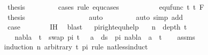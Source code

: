 \begin{isabellebody}
\ {\isacharquery}{\kern0pt}thesis\ \isanewline
\ \ \ \ \ \ \ \isamarkupfalse%
{\isacharparenleft}{\kern0pt}cases\ rule{\isacharcolon}{\kern0pt}\ equ{\isachardot}{\kern0pt}cases{\isacharparenright}{\kern0pt}\isanewline
\ \ \ \ \ \ \ \ \ \isamarkupfalse%
\ {\isacharparenleft}{\kern0pt}equ{\isacharunderscore}{\kern0pt}func\ t{}\ t{}\ F{\isacharparenright}{\kern0pt}\isanewline
\ \ \ \ \ \ \ \ \ \isamarkupfalse%
\ \isamarkupfalse%
\ {\isacharquery}{\kern0pt}thesis\ \isanewline
\ \ \ \ \ \ \ \ \ \ \ \isamarkupfalse%
\ {}\ {}{\isacharparenleft}{\kern0pt}{}{\isacharcomma}{\kern0pt}{}{\isacharcomma}{\kern0pt}{}{\isacharcomma}{\kern0pt}{}{\isacharparenright}{\kern0pt}\ \isamarkupfalse%
\ auto\isanewline
\ \ \ \ \ \ \ \isamarkupfalse%
\ {\isacharparenleft}{\kern0pt}auto\ simp\ add{\isacharcolon}{\kern0pt}\ {}{\isacharparenright}{\kern0pt}\isanewline
\ \ \ \ \ \isamarkupfalse%
\isanewline
\ \ \ \isamarkupfalse%
\isanewline
\ \ \ \isamarkupfalse%
\ \isamarkupfalse%
\ {\isacharquery}{\kern0pt}case\ \isanewline
\ \ \ \ \ \isamarkupfalse%
\ IH{\isacharparenleft}{\kern0pt}{}{\isacharcomma}{\kern0pt}{}{\isacharparenright}{\kern0pt}\ \isamarkupfalse%
\ blast\isanewline
\ \isamarkupfalse%
%
\endisatagproof
{\isafoldproof}%
%
\isadelimproof
\isanewline
%
\endisadelimproof
\isanewline
\isanewline
\isanewline
{}\isamarkupfalse%
\ pi{\isacharunderscore}{\kern0pt}right{\isacharunderscore}{\kern0pt}equ{\isacharunderscore}{\kern0pt}help{\isacharcolon}{\kern0pt}\isanewline
\ \ \ {\isachardoublequoteopen}{\isacharparenleft}{\kern0pt}n\ {\isacharequal}{\kern0pt}\ depth\ t{\isacharparenright}{\kern0pt}{\isachardoublequoteclose}\isanewline
\ \ \ {\isachardoublequoteopen}nabla\ {\isasymturnstile}\ t\ {\isasymapprox}\ swap\ pi\ t\ {\isasymLongrightarrow}\ {\isasymforall}\ a\ {\isasymin}\ ds\ {\isacharbrackleft}{\kern0pt}{\isacharbrackright}{\kern0pt}\ pi{\isachardot}{\kern0pt}\ nabla\ {\isasymturnstile}\ a\ {\isasymsharp}\ t{\isachardoublequoteclose}\isanewline
%
\isadelimproof
\ \ %
\endisadelimproof
%
\isatagproof
{}\isamarkupfalse%
\ assms\ \isanewline
{}\isamarkupfalse%
{\isacharparenleft}{\kern0pt}induction\ n\ arbitrary{\isacharcolon}{\kern0pt}\ t\ pi\ rule{\isacharcolon}{\kern0pt}\ nat{\isacharunderscore}{\kern0pt}less{\isacharunderscore}{\kern0pt}induct{\isacharparenright}{\kern0pt}\isanewline

\end{isabellebody}
